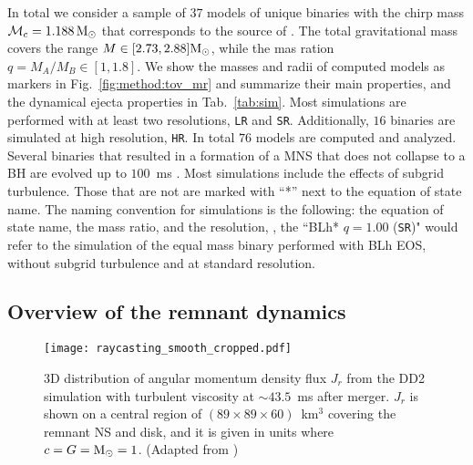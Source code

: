 In total we consider a sample of $37$ models of unique binaries with the 
chirp mass $\mathcal{M}_c = 1.188\,{\text{M}_{\odot}}$ that corresponds to the source of \GW{}.
%
The total gravitational mass covers the range $M\in[2.73, 2.88]{\text{M}_{\odot}}$, while the 
mas ration $q=M_A/M_B\in[1,1.8]$. 
%
We show the masses and radii of computed models as markers in 
Fig.~\ref{fig:method:tov_mr} and summarize their main properties, 
and the dynamical ejecta properties in Tab.~\ref{tab:sim}.
%
Most simulations are performed with at least two resolutions, 
\texttt{LR} and \texttt{SR}. 
Additionally, $16$ binaries are simulated at high resolution, \texttt{HR}.
In total $76$ models are computed and analyzed.
%
Several binaries that resulted in a formation of a \ac{MNS} that does not collapse 
to a \ac{BH} are evolved up to $100$~ms \pmerg.
%
Most simulations include the effects of subgrid turbulence. 
Those that are not are marked with ``*'' next to the equation of state name.
%
The naming convention for simulations is the following: 
the equation of state name, the mass ratio, and the resolution, \eg, 
the ``BLh* $q=1.00$ (\texttt{SR})" would refer to the simulation of the equal mass
binary performed with BLh \ac{EOS}, without subgrid turbulence and at standard resolution. 




\subsection{Overview of the remnant dynamics}
\label{sec:bns_dynsmics_overview}




\begin{figure}[t]
    \centering
    \texttt{[image: raycasting\_smooth\_cropped.pdf]}
    \caption{3D distribution of angular momentum density flux $J_r$
        from the DD2 simulation with turbulent viscosity at ${\sim}43.5$~ms after
        merger. $J_r$ is shown on a central region of
        $(89\times89\times60)$~km${}^3$ covering the remnant NS
        and disk, and it is given in units where $c=G={\text{M}_{\odot}}=1$.
        (Adapted from \citet{Nedora:2019jhl})
    }
    \label{fig:ang_mom_flux}
\end{figure}

